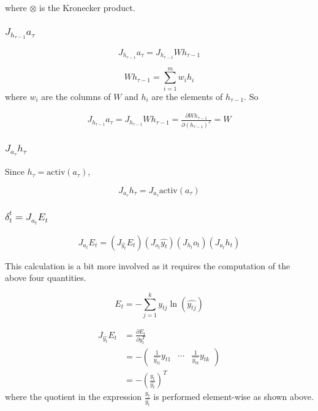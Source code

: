 where $\otimes$ is the Kronecker product.

\subsubsection{$J_{h_{\tau - 1}} a_\tau$}

\begin{equation*}
J_{h_{\tau - 1}} a_\tau = J_{h_{\tau - 1}} W h_{\tau - 1}
\end{equation*}

\begin{equation*}
W h_{\tau - 1} = \sum_{i=1}^m w_i h_i
\end{equation*}
%
where $w_i$ are the columns of $W$ and $h_i$ are the elements of $h_{\tau - 1}$. So

\begin{align*}
  J_{h_{\tau - 1}} a_\tau = J_{h_{\tau - 1}} W h_{\tau - 1} = \frac{\partial W h_{\tau - 1}}{\partial (h_{\tau-1})^T} = W
\end{align*}

\subsubsection{$J_{a_\tau} h_\tau$}

Since $h_\tau = \mbox{activ}(a_\tau)$,

\begin{equation*}
J_{a_\tau} h_\tau = J_{a_\tau}\mbox{activ}(a_\tau)
\end{equation*}

\subsubsection{$\delta_t^t = J_{a_t} E_t$}

\begin{equation*}
J_{a_t} E_t = (J_{\widehat{y_t}} E_t)(J_{o_t}\widehat{y_t})(J_{h_t}o_t)(J_{a_t}h_t)
\end{equation*}

This calculation is a bit more involved as it requires the computation of the above four quantities.

\begin{equation*}
  E_t = -\sum_{j=1}^{k} y_{tj} \ln \left(\widehat{y_{tj}}\right)
\end{equation*}

\begin{align*}
  J_{\widehat{y_t}}E_t & = \frac{\partial E_t}{\partial y_t^T} \\
  & = -\begin{pmatrix}\frac{1}{\widehat{y_{t1}}}y_{t1} & \cdots & \frac{1}{\widehat{y_{tk}}}y_{tk}\end{pmatrix} \\
  & = -\left(\frac{y_t}{\widehat{y_t}}\right)^T
\end{align*}
%
where the quotient in the expression $\frac{y_t}{\widehat{y_t}}$ is performed element-wise as shown above.

